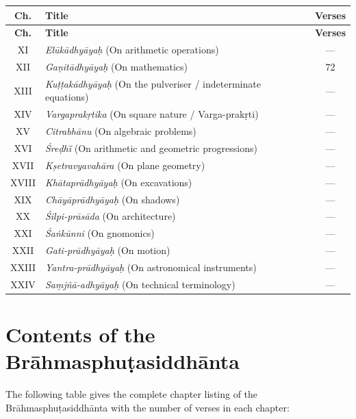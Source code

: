 \documentclass[11pt,a4paper]{article}
\begin{document}
\begin{longtable}{|c|p{8.5cm}|c|}
\hline
\textbf{Ch.} & \textbf{Title} & \textbf{Verses} \\
\hline
\endfirsthead
\hline
\textbf{Ch.} & \textbf{Title} & \textbf{Verses} \\
\hline
\endhead
XI & \textit{El\=uk\=adhy\=ayaḥ} (On arithmetic operations) & --- \\
XII & \textit{Gaṇit\=adhy\=ayaḥ} (On mathematics) & 72 \\
XIII & \textit{Kuṭṭak\=adhy\=ayaḥ} (On the pulveriser / indeterminate equations) & --- \\
XIV & \textit{Vargaprakṛtika} (On square nature / Varga-prakṛti) & --- \\
XV & \textit{Citrabh\=anu} (On algebraic problems) & --- \\
XVI & \textit{\'Sreḍh\=ī} (On arithmetic and geometric progressions) & --- \\
XVII & \textit{Kṣetravyavah\=ara} (On plane geometry) & --- \\
XVIII & \textit{Kh\=atapr\=adhy\=ayaḥ} (On excavations) & --- \\
XIX & \textit{Ch\=ay\=apr\=adhy\=ayaḥ} (On shadows) & --- \\
XX & \textit{\'Silpi-pr\=as\=ada} (On architecture) & --- \\
XXI & \textit{\'Saṅk\=unni} (On gnomonics) & --- \\
XXII & \textit{Gati-pr\=adhy\=ayaḥ} (On motion) & --- \\
XXIII & \textit{Yantra-pr\=adhy\=ayaḥ} (On astronomical instruments) & --- \\
XXIV & \textit{Saṃjñ\=a-adhy\=ayaḥ} (On technical terminology) & --- \\
\hline
\end{longtable}

\clearpage

\section*{Contents of the Br\=ahmasphuṭasiddh\=anta}

The following table gives the complete chapter listing of the Br\=ahmasphuṭasiddh\=anta with the number of verses in each chapter:
\end{document}
